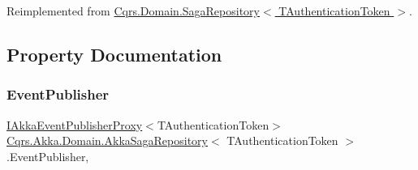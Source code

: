 Reimplemented from \hyperlink{classCqrs_1_1Domain_1_1SagaRepository_a1dec03959e4d859c6cf2be0507b1bc05}{Cqrs.\+Domain.\+Saga\+Repository$<$ T\+Authentication\+Token $>$}.



\subsection{Property Documentation}
\mbox{\label{classCqrs_1_1Akka_1_1Domain_1_1AkkaSagaRepository_a25957859d1f98ea7f434983c562e9724}} 
\subsubsection{\texorpdfstring{Event\+Publisher}{EventPublisher}}
{\footnotesize\ttfamily \hyperlink{interfaceCqrs_1_1Akka_1_1Events_1_1IAkkaEventPublisherProxy}{I\+Akka\+Event\+Publisher\+Proxy}$<$T\+Authentication\+Token$>$ \hyperlink{classCqrs_1_1Akka_1_1Domain_1_1AkkaSagaRepository}{Cqrs.\+Akka.\+Domain.\+Akka\+Saga\+Repository}$<$ T\+Authentication\+Token $>$.Event\+Publisher\hspace{0.3cm}{\ttfamily [get]}, {\ttfamily [protected]}}

